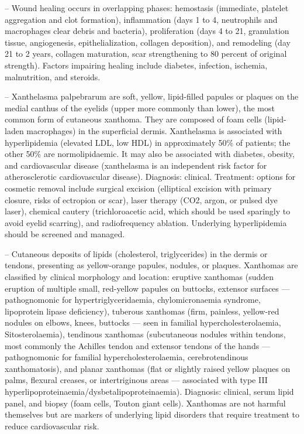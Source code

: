 -- Wound healing occurs in overlapping phases: hemostasis (immediate, platelet aggregation and clot formation), inflammation (days 1 to 4, neutrophils and macrophages clear debris and bacteria), proliferation (days 4 to 21, granulation tissue, angiogenesis, epithelialization, collagen deposition), and remodeling (day 21 to 2 years, collagen maturation, scar strengthening to 80 percent of original strength). Factors impairing healing include diabetes, infection, ischemia, malnutrition, and steroids.

-- Xanthelasma palpebrarum are soft, yellow, lipid-filled papules or plaques on the medial canthus of the eyelids (upper more commonly than lower), the most common form of cutaneous xanthoma. They are composed of foam cells (lipid-laden macrophages) in the superficial dermis. Xanthelasma is associated with hyperlipidemia (elevated LDL, low HDL) in approximately 50\% of patients; the other 50\% are normolipidaemic. It may also be associated with diabetes, obesity, and cardiovascular disease (xanthelasma is an independent risk factor for atherosclerotic cardiovascular disease). Diagnosis: clinical. Treatment: options for cosmetic removal include surgical excision (elliptical excision with primary closure, risks of ectropion or scar), laser therapy (CO2, argon, or pulsed dye laser), chemical cautery (trichloroacetic acid, which should be used sparingly to avoid eyelid scarring), and radiofrequency ablation. Underlying hyperlipidemia should be screened and managed.

-- Cutaneous deposits of lipids (cholesterol, triglycerides) in the dermis or tendons, presenting as yellow-orange papules, nodules, or plaques. Xanthomas are classified by clinical morphology and location: eruptive xanthomas (sudden eruption of multiple small, red-yellow papules on buttocks, extensor surfaces — pathognomonic for hypertriglyceridaemia, chylomicronaemia syndrome, lipoprotein lipase deficiency), tuberous xanthomas (firm, painless, yellow-red nodules on elbows, knees, buttocks — seen in familial hypercholesterolaemia, Sitosterolaemia), tendinous xanthomas (subcutaneous nodules within tendons, most commonly the Achilles tendon and extensor tendons of the hands — pathognomonic for familial hypercholesterolaemia, cerebrotendinous xanthomatosis), and planar xanthomas (flat or slightly raised yellow plaques on palms, flexural creases, or intertriginous areas — associated with type III hyperlipoproteinaemia/dysbetalipoproteinaemia). Diagnosis: clinical, serum lipid panel, and biopsy (foam cells, Touton giant cells). Xanthomas are not harmful themselves but are markers of underlying lipid disorders that require treatment to reduce cardiovascular risk.

